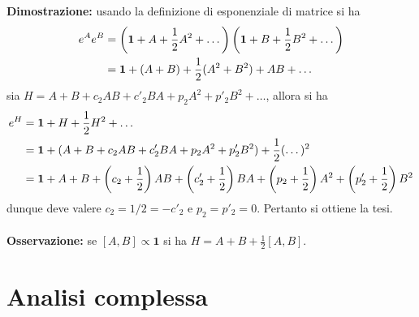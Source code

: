 \documentclass{article}
\begin{document}
\textbf{Dimostrazione:} usando la definizione di esponenziale di matrice si ha
\begin{align}
    e^Ae^B &= \left(\mathbf{1} + A + \frac{1}{2}A^2 + \dots\right)\left(\mathbf{1} + B + \frac{1}{2}B^2 + \dots\right) \notag \\
    &= \mathbf{1} + (A + B) + \frac{1}{2}(A^2 + B^2) + AB + \dots \notag
\end{align}
sia $H = A + B + c_2AB + c'_2BA + p_2A^2 + p'_2B^2 + \dots$, allora si ha
\begin{align}
    e^H &= \mathbf{1} + H + \frac{1}{2}H^2 + \dots \notag \\
    &= \mathbf{1} + (A + B + c_2AB + c'_2BA + p_2A^2 + p'_2B^2) + \frac{1}{2}(\dots)^2 \notag \\
    &= \mathbf{1} + A + B + \left(c_2 + \frac{1}{2}\right)AB + \left(c'_2 + \frac{1}{2}\right)BA + \left(p_2 + \frac{1}{2}\right)A^2 + \left(p'_2 + \frac{1}{2}\right)B^2 \notag
\end{align}
dunque deve valere $c_2 = 1/2 = -c'_2$ e $p_2 = p'_2 = 0$. Pertanto si ottiene la tesi. \\ \\
\textbf{Osservazione:} se $[A, B] \propto \mathbf{1}$ si ha $H = A + B + \frac{1}{2}[A, B]$.




\newpage
\section{Analisi complessa}
\end{document}
